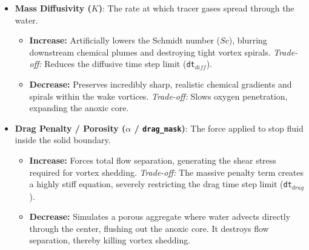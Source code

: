 \documentclass{article}
\begin{document}
\begin{itemize}
    \item \textbf{Mass Diffusivity ($K$)}: The rate at which tracer gases spread through the water.
        \begin{itemize}
            \item \textbf{Increase:} Artificially lowers the Schmidt number ($Sc$), blurring downstream chemical plumes and destroying tight vortex spirals. \textit{Trade-off:} Reduces the diffusive time step limit (\texttt{dt$_{diff}$}).
            \item \textbf{Decrease:} Preserves incredibly sharp, realistic chemical gradients and spirals within the wake vortices. \textit{Trade-off:} Slows oxygen penetration, expanding the anoxic core.
        \end{itemize}



    \item \textbf{Drag Penalty / Porosity ($\alpha$ / \texttt{drag\_mask})}: The force applied to stop fluid inside the solid boundary.
        \begin{itemize}
            \item \textbf{Increase:} Forces total flow separation, generating the shear stress required for vortex shedding. \textit{Trade-off:} The massive penalty term creates a highly stiff equation, severely restricting the drag time step limit (\texttt{dt$_{drag}$}).
            \item \textbf{Decrease:} Simulates a porous aggregate where water advects directly through the center, flushing out the anoxic core. It destroys flow separation, thereby killing vortex shedding.
        \end{itemize}
\end{itemize}
\end{document}
